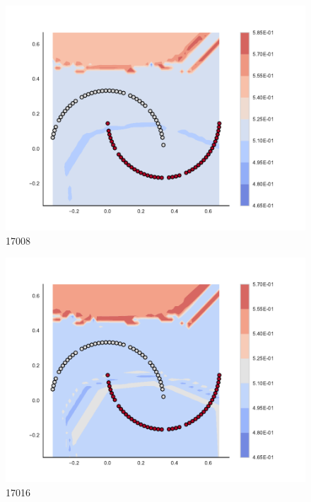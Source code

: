 \begin{subfigure}[b]{0.09\textwidth}
    \includegraphics[clip, trim=2.35cm 1.75cm 4.5cm 0cm,width=\textwidth]{img/convergence/17008.pdf}
    \caption{17008}
    \label{fig:convergence_17008}
\end{subfigure}
%
\begin{subfigure}[b]{0.09\textwidth}
    \includegraphics[clip, trim=2.35cm 1.75cm 4.5cm 0cm,width=\textwidth]{img/convergence/17016.pdf}
    \caption{17016}
    \label{fig:convergence_17016}
\end{subfigure}
%
